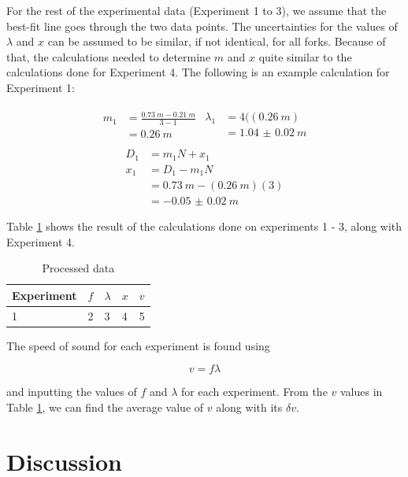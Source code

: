 \documentclass[letter]{article}
\numberwithin{equation}{section}
\numberwithin{figure}{section}
\numberwithin{table}{section}
\begin{document}
For the rest of the experimental data (Experiment 1 to 3), we assume that the best-fit line goes through the two data points. The uncertainties for the values of \(\lambda\) and \(x\) can be assumed to be similar, if not identical, for all forks. Because of that, the calculations needed to determine \(m\) and \(x\) quite similar to the calculations done for Experiment 4. The following is an example calculation for Experiment 1:

\begin{align*}
  \begin{split}
    m_1 &= \frac{\SI{0.73}{m} - \SI{0.21}{m}}{3 - 1} \\
    &= \SI{0.26}{m}
  \end{split} 
  \begin{split}
    \lambda_1 &= 4((\SI{0.26}{m}) \\
    &= \SI{1.04(2)}{m}
  \end{split} \\
\end{align*}
\begin{equation*}
  \begin{split}
    D_1 &= m_1 N + x_1 \\ 
    x_1 &= D_1 - m_1 N \\
    &= \SI{0.73}{m} - (\SI{0.26}{m})(3) \\
    &= \SI{-0.05(2)}{m}
  \end{split}
\end{equation*}

Table \ref{table:a1} shows the result of the calculations done on experiments 1 - 3, along with Experiment 4.

\begin{table}[h]
  \centering
  \begin{tabular}{|l|l|l|l|l|}
    \hline
    Experiment & \(f\) & \(\lambda\) & \(x\) & \(v\) \\
    \hline
    1 & 2 & 3 & 4 & 5 \\
    \hline
  \end{tabular}
  \caption{Processed data}
  \label{table:a1}
\end{table}

The speed of sound for each experiment is found using 

\begin{equation} \label{eq:a4}
v = f \lambda
\end{equation}

and inputting the values of \(f\) and \(\lambda\) for each experiment. From the \(v\) values in Table \ref{table:a1}, we can find the average value of \(v\) along with its \(\delta v\).
\section{Discussion}
\end{document}
